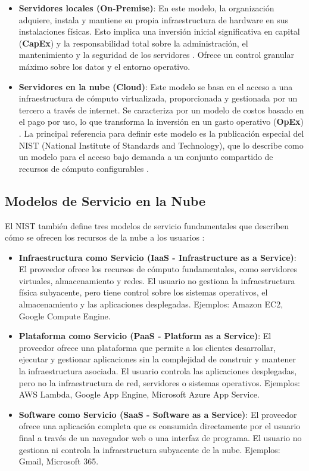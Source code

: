 \begin{itemize}
    \item \textbf{Servidores locales (On-Premise)}: En este modelo, la organización adquiere, instala y mantiene su propia infraestructura de hardware en sus instalaciones físicas. Esto implica una inversión inicial significativa en capital (\textbf{CapEx}) y la responsabilidad total sobre la administración, el mantenimiento y la seguridad de los servidores \cite{Mullins2012}. Ofrece un control granular máximo sobre los datos y el entorno operativo.

    \item \textbf{Servidores en la nube (Cloud)}: Este modelo se basa en el acceso a una infraestructura de cómputo virtualizada, proporcionada y gestionada por un tercero a través de internet. Se caracteriza por un modelo de costos basado en el pago por uso, lo que transforma la inversión en un gasto operativo (\textbf{OpEx}) \cite{softteco2024}. La principal referencia para definir este modelo es la publicación especial del NIST (National Institute of Standards and Technology), que lo describe como un modelo para el acceso bajo demanda a un conjunto compartido de recursos de cómputo configurables \cite{mell2011nist}.
\end{itemize}

\subsection{Modelos de Servicio en la Nube}
\label{subsec:modelos_servicio_nube}

El NIST también define tres modelos de servicio fundamentales que describen cómo se ofrecen los recursos de la nube a los usuarios \cite{mell2011nist}:

\begin{itemize}
    \item \textbf{Infraestructura como Servicio (IaaS - Infrastructure as a Service)}: El proveedor ofrece los recursos de cómputo fundamentales, como servidores virtuales, almacenamiento y redes. El usuario no gestiona la infraestructura física subyacente, pero tiene control sobre los sistemas operativos, el almacenamiento y las aplicaciones desplegadas. Ejemplos: Amazon EC2, Google Compute Engine.

    \item \textbf{Plataforma como Servicio (PaaS - Platform as a Service)}: El proveedor ofrece una plataforma que permite a los clientes desarrollar, ejecutar y gestionar aplicaciones sin la complejidad de construir y mantener la infraestructura asociada. El usuario controla las aplicaciones desplegadas, pero no la infraestructura de red, servidores o sistemas operativos. Ejemplos: AWS Lambda, Google App Engine, Microsoft Azure App Service.

    \item \textbf{Software como Servicio (SaaS - Software as a Service)}: El proveedor ofrece una aplicación completa que es consumida directamente por el usuario final a través de un navegador web o una interfaz de programa. El usuario no gestiona ni controla la infraestructura subyacente de la nube. Ejemplos: Gmail, Microsoft 365.
\end{itemize}

